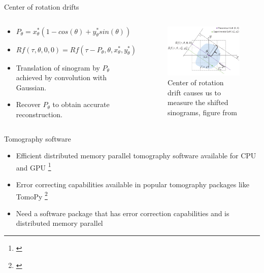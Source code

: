 \documentclass{beamer}
\begin{document}
\begin{frame}{Center of rotation drifts}
	\begin{columns}[onlytextwidth,T]
		\column{\dimexpr\linewidth-45mm}
		\begin{block}{}
			\begin{itemize}
				\item $P_{\theta} = x_{\theta}^{*}(1-cos(\theta) + y_{\theta}^{*}sin(\theta))$ 
				\item $Rf(\tau,\theta,0,0) = Rf(\tau - P_{\theta},\theta,x_{\theta}^{*},y_{\theta}^{*})$
				\item Translation of sinogram by $P_{\theta}$ achieved by convolution with Gaussian.
				\item Recover $P_{\theta}$ to obtain accurate reconstruction\footnotemark.
			\end{itemize}					
		\end{block}
		\column{40mm}
		\begin{figure}
			\includegraphics[width=45mm]{figures/drifts.png}
			\caption{Center of rotation drift causes us to measure the shifted sinograms, figure from \cite{wendy_2019}}
		\end{figure}
	\end{columns}
\end{frame}

\begin{frame}{Tomography software}
	\begin{itemize}
		\item Efficient distributed memory parallel tomography software available for CPU and GPU \footnote{\cite{marchesini_inproc_2020, hidayetouglu_inproc_2019, peng_inproc_2019, palenstijn_asci_2016, bicer_asci_2017}}
		\item Error correcting capabilities available in popular tomography packages like TomoPy \footnote{\cite{gursoy_2017}}
		\item Need a software package that has error correction capabilities and is distributed memory parallel
	\end{itemize}
\end{frame}
\end{document}

